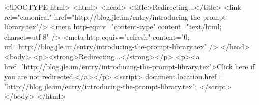 <!DOCTYPE html>
<html>
<head>
<title>Redirecting...</title>
<link rel="canonical" href="http://blog.jle.im/entry/introducing-the-prompt-library.tex"/>
<meta http-equiv="content-type" content="text/html; charset=utf-8" />
<meta http-equiv="refresh" content="0; url=http://blog.jle.im/entry/introducing-the-prompt-library.tex" />
</head>
<body>
  <p><strong>Redirecting...</strong></p>
  <p><a href='http://blog.jle.im/entry/introducing-the-prompt-library.tex'>Click here if you are not redirected.</a></p>
  <script>
    document.location.href = "http://blog.jle.im/entry/introducing-the-prompt-library.tex";
  </script>
</body>
</html>
